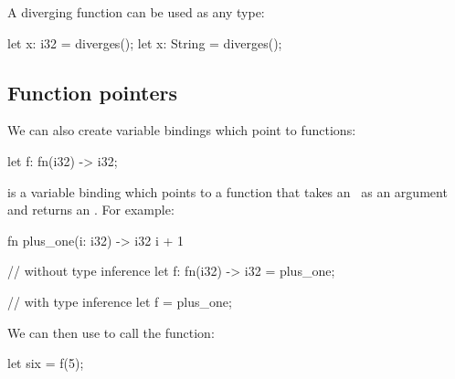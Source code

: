 A diverging function can be used as any type:

\begin{rustc}
let x: i32 = diverges();
let x: String = diverges();
\end{rustc}

\subsection*{Function pointers}

We can also create variable bindings which point to functions:

\begin{rustc}
let f: fn(i32) -> i32;
\end{rustc}

 is a variable binding which points to a function that takes an \itt\ as an argument and returns an \itt. 
For example:

\begin{rustc}
fn plus_one(i: i32) -> i32 {
    i + 1
}

// without type inference
let f: fn(i32) -> i32 = plus_one;

// with type inference
let f = plus_one;
\end{rustc}

We can then use  to call the function:

\begin{rustc}
let six = f(5);
\end{rustc}
